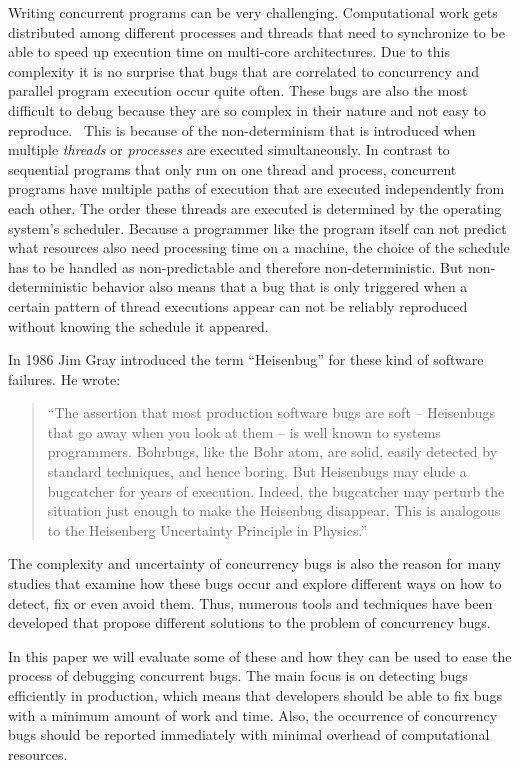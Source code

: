 \documentclass[conference]{IEEEtran}
\begin{document}
Writing concurrent programs can be very challenging.
Computational work gets distributed among different processes and threads that need to synchronize to be able to speed up execution time on multi-core architectures.
Due to this complexity it is no surprise that bugs that are correlated to concurrency and parallel program execution occur quite often.
These bugs are also the most difficult to debug because they are so complex in their nature and not easy to reproduce.~\cite{tu2019go}
This is because of the non-determinism that is introduced when multiple \emph{threads} or \emph{processes} are executed simultaneously.
In contrast to sequential programs that only run on one thread and process, concurrent programs have multiple paths of execution that are executed independently from each other.
The order these threads are executed is determined by the operating system's scheduler.
Because a programmer like the program itself can not predict what resources also need processing time on a machine, the choice of the schedule has to be handled as non-predictable and therefore non-deterministic.
But non-deterministic behavior also means that a bug that is only triggered when a certain pattern of thread executions appear can not be reliably reproduced without knowing the schedule it appeared.

In 1986 Jim Gray introduced the term ``Heisenbug'' for these kind of software failures.
He wrote:

\begin{quote}
``The assertion that most production software bugs are soft -- Heisenbugs that go away when you look at them -- is well known to systems programmers. Bohrbugs, like the Bohr atom, are solid, easily detected by standard techniques, and hence boring. But Heisenbugs may elude a bugcatcher for years of execution. Indeed, the bugcatcher may perturb the situation just enough to make the Heisenbug disappear. This is analogous to the Heisenberg Uncertainty Principle in Physics.''\cite{gray1986computers}
\end{quote}

The complexity and uncertainty of concurrency bugs is also the reason for many studies that examine how these bugs occur and explore different ways on how to detect, fix or even avoid them.
Thus, numerous tools and techniques have been developed that propose different solutions to the problem of concurrency bugs.

In this paper we will evaluate some of these and how they can be used to ease the process of debugging concurrent bugs.
The main focus is on detecting bugs efficiently in production, which means that developers should be able to fix bugs with a minimum amount of work and time.
Also, the occurrence of concurrency bugs should be reported immediately with minimal overhead of computational resources.
\end{document}
